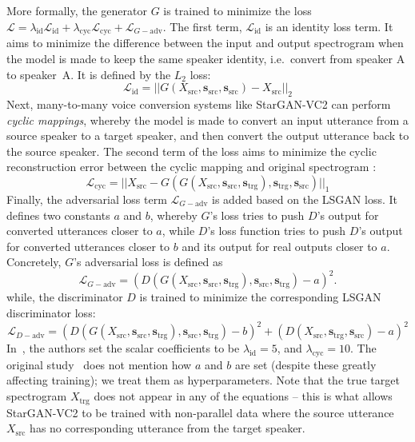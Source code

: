 More formally, the generator $G$ is trained to minimize the loss $\mathcal{L} = \lambda_{\text{id}}\mathcal{L}_{\text{id}} + \lambda_{\text{cyc}}\mathcal{L}_{\text{cyc}} + \mathcal{L}_{G-\text{adv}}$.
The first term, $\mathcal{L}_{\text{id}}$ is an identity loss term.
It aims to minimize the difference between the input and output spectrogram when the model is made to keep the same speaker identity, i.e.\ convert from speaker A to speaker~A. 
It is defined by the $L_2$ loss:
\begin{equation}
    \mathcal{L}_{\text{id}} = ||G(X_\text{src}, \mathbf{s}_{\text{src}}, \mathbf{s}_{\text{src}}) - X_\text{src}||_2
\end{equation}
Next, many-to-many voice conversion systems like StarGAN-VC2 can perform \textit{cyclic mappings}, whereby the model is made to convert an input utterance from a source speaker to a target speaker, and then convert the output utterance back to the source speaker.
The second term of the loss aims to minimize the cyclic reconstruction error between the cyclic mapping and original spectrogram \cite{choi2018stargan}:
\begin{equation}
    \mathcal{L}_{\text{cyc}} = ||X_\text{src} - G(G(X_\text{src}, \mathbf{s}_{\text{src}}, \mathbf{s}_{\text{trg}}), \mathbf{s}_{\text{trg}}, \mathbf{s}_{\text{src}})||_1
\end{equation}
Finally, the adversarial loss term $\mathcal{L}_{G-\text{adv}}$ is added based on the LSGAN \cite{LSGAN} loss.
It defines two constants $a$ and $b$, whereby $G$'s loss tries to push $D$'s output for converted utterances closer to $a$, while $D$'s loss function tries to push $D$'s output for converted utterances closer to $b$ and its output for real outputs closer to $a$. 
Concretely, $G$'s adversarial loss is defined as
\begin{equation}
    \mathcal{L}_{G-\text{adv}} = \left( D(G(X_\text{src}, \mathbf{s}_{\text{src}},\mathbf{s}_{\text{trg}}), \mathbf{s}_{\text{src}}, \mathbf{s}_{\text{trg}}) - a \right)^2.
\end{equation}
while, the discriminator $D$ is trained to minimize the corresponding LSGAN discriminator loss:
\begin{equation}
    \mathcal{L}_{D-\text{adv}} = \left( D(G(X_\text{src}, \mathbf{s}_{\text{src}},\mathbf{s}_{\text{trg}}), \mathbf{s}_{\text{src}}, \mathbf{s}_{\text{trg}}) - b \right)^2 + \left( D(X_\text{src}, \mathbf{s}_{\text{trg}}, \mathbf{s}_{\text{src}}) - a \right)^2
\end{equation}
In~\cite{stargan-vc2}, the authors set the scalar coefficients to be $\lambda_\text{id}=5$, and $\lambda_\text{cyc}=10$.
The original study~\cite{stargan-vc2} does not mention how $a$ and $b$ are set (despite these greatly affecting training); we treat them as hyperparameters.
Note that the true target spectrogram $X_\text{trg}$ does not appear in any of the equations -- this is what allows StarGAN-VC2 to be trained with non-parallel data where the source utterance $X_\text{src}$ has no corresponding utterance from the target speaker.

